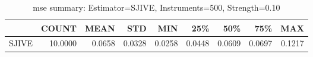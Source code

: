 \begin{table}[ht]
\centering
\caption{mse summary: Estimator=SJIVE, Instruments=500, Strength=0.10}
\begin{tabular}{lrrrrrrrr}
\toprule
 & COUNT & MEAN & STD & MIN & 25\% & 50\% & 75\% & MAX \\
\midrule
SJIVE & 10.0000 & 0.0658 & 0.0328 & 0.0258 & 0.0448 & 0.0609 & 0.0697 & 0.1217 \\
\bottomrule
\end{tabular}
\end{table}
